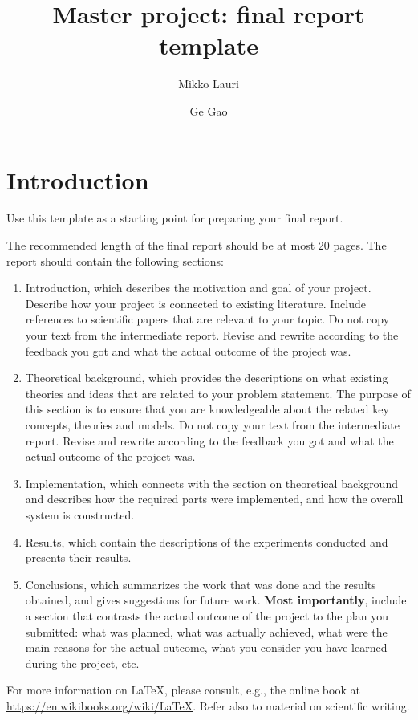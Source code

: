 \documentclass[a4paper,11pt,english]{article}
\begin{document}
\title{Master project: final report template}
\author{Mikko Lauri \and Ge Gao}
	
\maketitle 

\section{Introduction}
Use this template as a starting point for preparing your final report.

The recommended length of the final report should be at most 20 pages.
The report should contain the following sections:
\begin{enumerate}
	\item Introduction, which describes the motivation and goal of your project. Describe how your project is connected to existing literature. Include references to scientific papers that are relevant to your topic. Do not copy your text from the intermediate report. Revise and rewrite according to the feedback you got and what the actual outcome of the project was.
	\item Theoretical background, which provides the descriptions on what existing theories and ideas that are related to your problem statement. The purpose of this section is to ensure that you are knowledgeable about the related key concepts, theories and models. Do not copy your text from the intermediate report. Revise and rewrite according to the feedback you got and what the actual outcome of the project was.
	\item Implementation, which connects with the section on theoretical background and describes how the required parts were implemented, and how the overall system is constructed.
	\item Results, which contain the descriptions of the experiments conducted and presents their results.
	\item Conclusions, which summarizes the work that was done and the results obtained, and gives suggestions for future work. \textbf{Most importantly}, include a section that contrasts the actual outcome of the project to the plan you submitted: what was planned, what was actually achieved, what were the main reasons for the actual outcome, what you consider you have learned during the project, etc.
\end{enumerate}

For more information on \LaTeX, please consult, e.g., the online book at \url{https://en.wikibooks.org/wiki/LaTeX}.
Refer also to material on scientific writing.
\end{document}
